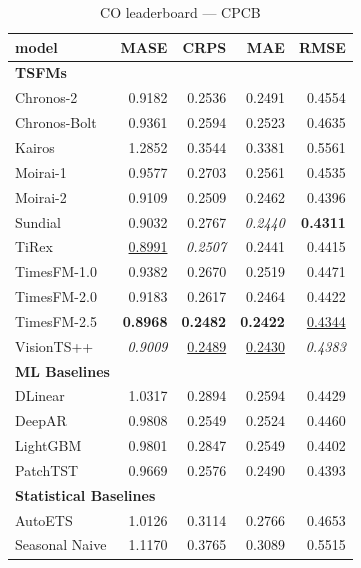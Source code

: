 \begin{table}[H]
\caption{CO leaderboard --- CPCB}
\centering
\begin{small}
\begin{tabular}{lrrrr}
\toprule
model & MASE & CRPS & MAE & RMSE \\
\midrule
\multicolumn{5}{l}{\textbf{TSFMs}} \\
Chronos-2 & 0.9182 & 0.2536 & 0.2491 & 0.4554 \\
Chronos-Bolt & 0.9361 & 0.2594 & 0.2523 & 0.4635 \\
Kairos & 1.2852 & 0.3544 & 0.3381 & 0.5561 \\
Moirai-1 & 0.9577 & 0.2703 & 0.2561 & 0.4535 \\
Moirai-2 & 0.9109 & 0.2509 & 0.2462 & 0.4396 \\
Sundial & 0.9032 & 0.2767 & \textit{0.2440} & \textbf{0.4311} \\
TiRex & \underline{0.8991} & \textit{0.2507} & 0.2441 & 0.4415 \\
TimesFM-1.0 & 0.9382 & 0.2670 & 0.2519 & 0.4471 \\
TimesFM-2.0 & 0.9183 & 0.2617 & 0.2464 & 0.4422 \\
TimesFM-2.5 & \textbf{0.8968} & \textbf{0.2482} & \textbf{0.2422} & \underline{0.4344} \\
VisionTS++ & \textit{0.9009} & \underline{0.2489} & \underline{0.2430} & \textit{0.4383} \\
\midrule
\multicolumn{5}{l}{\textbf{ML Baselines}} \\
DLinear & 1.0317 & 0.2894 & 0.2594 & 0.4429 \\
DeepAR & 0.9808 & 0.2549 & 0.2524 & 0.4460 \\
LightGBM & 0.9801 & 0.2847 & 0.2549 & 0.4402 \\
PatchTST & 0.9669 & 0.2576 & 0.2490 & 0.4393 \\
\midrule
\multicolumn{5}{l}{\textbf{Statistical Baselines}} \\
AutoETS & 1.0126 & 0.3114 & 0.2766 & 0.4653 \\
Seasonal Naive & 1.1170 & 0.3765 & 0.3089 & 0.5515 \\
\bottomrule
\end{tabular}
\end{small}
\end{table}